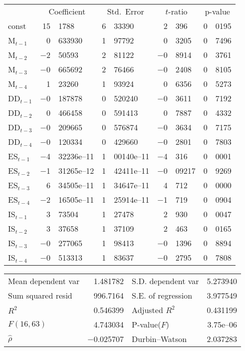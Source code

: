 \documentclass[11pt]{article}
\begin{document}
\begin{center}
\begin{tabular}{lr@{.}lr@{.}lr@{.}lr@{.}l}
  &
 \multicolumn{2}{c}{Coefficient} &
  \multicolumn{2}{c}{Std.\ Error} &
   \multicolumn{2}{c}{$t$-ratio} &
    \multicolumn{2}{c}{p-value} \\[1ex]
const &
  15&1788 &
    6&33390 &
      2&396 &
        0&0195 \\
M$_{t-1}$ &
  0&633930 &
    1&97792 &
      0&3205 &
        0&7496 \\
M$_{t-2}$ &
  $-$2&50593 &
    2&81122 &
      $-$0&8914 &
        0&3761 \\
M$_{t-3}$ &
  $-$0&665692 &
    2&76466 &
      $-$0&2408 &
        0&8105 \\
M$_{t-4}$ &
  1&23260 &
    1&93924 &
      0&6356 &
        0&5273 \\
DD$_{t-1}$ &
  $-$0&187878 &
    0&520240 &
      $-$0&3611 &
        0&7192 \\
DD$_{t-2}$ &
  0&466458 &
    0&591413 &
      0&7887 &
        0&4332 \\
DD$_{t-3}$ &
  $-$0&209665 &
    0&576874 &
      $-$0&3634 &
        0&7175 \\
DD$_{t-4}$ &
  $-$0&120334 &
    0&429660 &
      $-$0&2801 &
        0&7803 \\
ES$_{t-1}$ &
  $-$4&32236\textrm{e--11} &
    1&00140\textrm{e--11} &
      $-$4&316 &
        0&0001 \\
ES$_{t-2}$ &
  $-$1&31265\textrm{e--12} &
    1&42411\textrm{e--11} &
      $-$0&09217 &
        0&9269 \\
ES$_{t-3}$ &
  6&34505\textrm{e--11} &
    1&34647\textrm{e--11} &
      4&712 &
        0&0000 \\
ES$_{t-4}$ &
  $-$2&16505\textrm{e--11} &
    1&25914\textrm{e--11} &
      $-$1&719 &
        0&0904 \\
IS$_{t-1}$ &
  3&73504 &
    1&27478 &
      2&930 &
        0&0047 \\
IS$_{t-2}$ &
  3&37658 &
    1&37109 &
      2&463 &
        0&0165 \\
IS$_{t-3}$ &
  $-$0&277065 &
    1&98413 &
      $-$0&1396 &
        0&8894 \\
IS$_{t-4}$ &
  $-$0&513313 &
    1&83637 &
      $-$0&2795 &
        0&7808 \\
\end{tabular}

\vspace{1ex}
\begin{tabular}{lrlr}
Mean dependent var &  1.481782 & S.D. dependent var &  5.273940 \\
Sum squared resid &  996.7164 & S.E. of regression &  3.977549 \\
$R^2$ &  0.546399 & Adjusted $R^2$ &  0.431199 \\
$F(16, 63)$ &  4.743034 & P-value($F$) &  3.75\textrm{e--06} \\
$\hat{\rho}$ & $-$0.025707 & Durbin--Watson &  2.037283 \\
\end{tabular}


\end{center}
\end{document}
